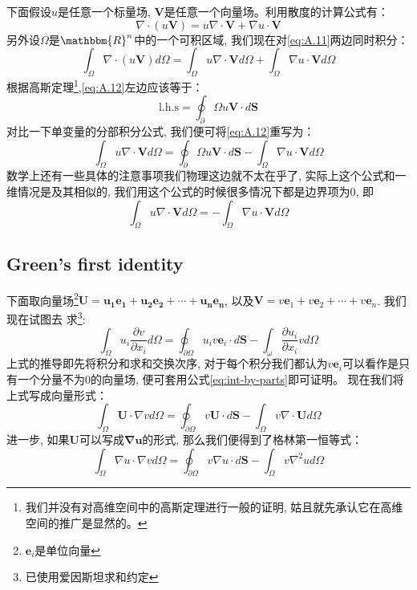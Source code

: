 下面假设$u$是任意一个标量场, $\mathbf{V}$是任意一个向量场。利用散度的计算公式有：
\begin{equation}
    \label{eq:A.11}
    \nabla\cdot\left(u\mathbf{V}\right)=u\nabla\cdot\mathbf{V}+\nabla u\cdot\mathbf{V}
\end{equation}
另外设$\Omega$是$\mathbbm{R}^n$中的一个可积区域, 我们现在对\ref{eq:A.11}两边同时积分：
\begin{equation}
    \label{eq:A.12}
    \int_\Omega \nabla\cdot\left(u\mathbf{V}\right)d\Omega =\int_\Omega u\nabla\cdot\mathbf{V} d\Omega +\int_\Omega\nabla u\cdot\mathbf{V}d\Omega
\end{equation}
根据高斯定理\footnote{我们并没有对高维空间中的高斯定理进行一般的证明, 姑且就先承认它在高维空间的推广是显然的。},\ref{eq:A.12}左边应该等于：
\[\text{l.h.s}=\oint_\partial\Omega u \mathbf{V}\cdot d\mathbf{S}\]
对比一下单变量的分部积分公式, 我们便可将\ref{eq:A.12}重写为：
\begin{equation}
    \label{eq:int-by-parts}
    \boxed{
        \int_\Omega u\nabla\cdot\mathbf{V} d\Omega=\oint_\partial\Omega u \mathbf{V}\cdot d\mathbf{S}-\int_\Omega\nabla u\cdot\mathbf{V}d\Omega
    }
\end{equation}
数学上还有一些具体的注意事项我们物理这边就不太在乎了, 实际上这个公式和一维情况是及其相似的, 我们用这个公式的时候很多情况下都是边界项为$0$, 即
\[\int_\Omega u\nabla\cdot\mathbf{V} d\Omega=-\int_\Omega\nabla u\cdot\mathbf{V}d\Omega\]
\subsection*{Green's first identity}
下面取向量场\footnote{$\mathbf{e}_i$是单位向量}$\mathbf{U=u_1\mathbf{e}_1+u_2\mathbf{e}_2+\cdots+u_n\mathbf{e}_n}$, 以及$\mathbf{V}=v\mathbf{e}_1+v\mathbf{e}_2+\cdots+v\mathbf{e}_n$. 我们现在试图去
求\footnote{已使用爱因斯坦求和约定}:
\[
    \int_\Omega u_i\frac{\partial v}{\partial x_i}d\Omega =\oint_{\partial\Omega} u_i v \mathbf{e}_i\cdot d\mathbf{S}-\int_\omega\frac{\partial u_i}{\partial x_i}v d\Omega
\]
上式的推导即先将积分和求和交换次序, 对于每个积分我们都认为$v\mathbf{e}_i$可以看作是只有一个分量不为0的向量场, 便可套用公式\ref{eq:int-by-parts}即可证明。
现在我们将上式写成向量形式：
\begin{equation}
    \int_{\Omega} \mathbf{U} \cdot \nabla v d \Omega=\oint_{\partial\Omega} v \mathbf{U} \cdot d\mathbf{S}-\int_{\Omega} v \nabla \cdot \mathbf{U} d \Omega
\end{equation}
进一步, 如果$\mathbf{U}$可以写成$\mathbf{\nabla u}$的形式, 那么我们便得到了格林第一恒等式：
\begin{equation}
    \int_{\Omega} \nabla u \cdot \nabla v d \Omega=\oint_{\partial\Omega} v \nabla u \cdot  d\mathbf{S}-\int_{\Omega} v \nabla^2 u d \Omega
\end{equation}

